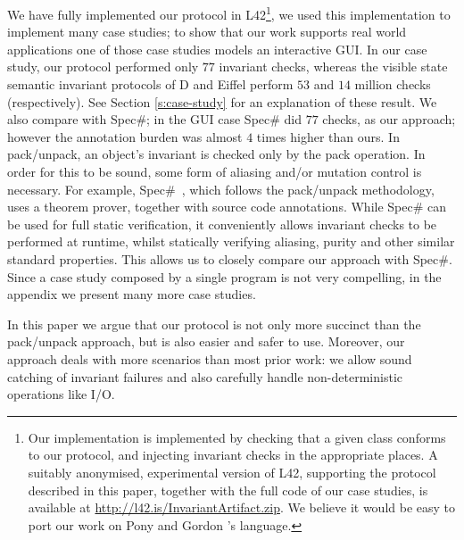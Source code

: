 We have fully implemented our protocol in L42\footnote{
Our implementation is implemented by checking that a given class conforms to our protocol, and injecting invariant checks in the appropriate places.
A suitably anonymised, experimental version of L42, supporting the protocol described in this paper, together with the full code of our case studies, is available at \url{http://l42.is/InvariantArtifact.zip}. We believe it would be easy to port our work on Pony and Gordon \etal's language.}, we used this implementation to implement many case studies; 
to show that our work supports real world applications one of those case studies models an interactive GUI.
In our case study, our protocol performed only $77$ invariant checks, whereas the visible state semantic invariant protocols of D and Eiffel perform $53$ and $14$ million checks (respectively). See Section \ref{s:case-study} for an explanation of these result.
We also compare with Spec\#; in the GUI case Spec\# did $77$ checks, as our approach; however the annotation burden was almost $4$ times higher than ours.
In pack/unpack, an object's invariant is checked only by the pack operation.
In order for this to be sound, some form of aliasing and/or mutation control is necessary. For example, Spec\#~\cite{Barnett:2004:SPS:2131546.2131549}, which follows the pack/unpack methodology, uses a theorem prover, together with source code annotations.
While Spec\# can be used for full static verification, it conveniently allows invariant checks to be performed
at runtime, whilst statically verifying aliasing, purity and other similar standard properties.
This allows us to closely compare our approach with Spec\#.
Since a case study composed by a single program is not very compelling, in the appendix we present many more case studies.


In this paper we argue that our protocol is not only more succinct than the pack/unpack approach, but is also easier and safer to use.
Moreover, our approach deals with more scenarios than most prior work: we allow sound catching of invariant failures and also carefully handle non-deterministic operations like I/O.


